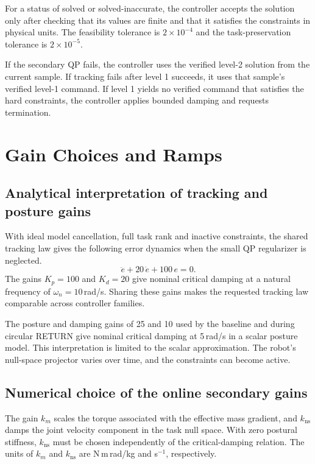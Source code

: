 \documentclass[12pt,a4paper]{article}
\begin{document}
For a status of solved or solved-inaccurate, the controller accepts the solution only
after checking that its values are finite and that it satisfies the constraints in
physical units. The feasibility tolerance is $2 \times 10^{-4}$ and the
task-preservation tolerance is $2 \times 10^{-5}$.

If the secondary QP fails, the controller uses the verified level-2 solution
from the current sample. If tracking fails after level 1 succeeds, it uses that
sample's verified level-1 command. If level 1 yields no verified command that
satisfies the hard constraints, the controller applies bounded damping and requests
termination.

\section{Gain Choices and Ramps}

\subsection{Analytical interpretation of tracking and posture gains}
With ideal model cancellation, full task rank and inactive constraints, the
shared tracking law gives the following error dynamics when the small QP
regularizer is neglected.
\begin{equation}
  \ddot e + 20\, \dot e + 100\, e = 0 .
\end{equation}
The gains $K_p = 100$ and $K_d = 20$ give nominal critical damping at a natural
frequency of $\omega_n = 10$\,rad/s. Sharing these gains makes the requested
tracking law comparable across controller families.

The posture and damping gains of 25 and 10 used by the baseline and during circular
RETURN give nominal critical damping at 5\,rad/s in a scalar posture model. This
interpretation is limited to the scalar approximation. The robot's null-space
projector varies over time, and the constraints can become active.

\subsection{Numerical choice of the online secondary gains}
The gain $k_m$ scales the torque associated with the effective mass gradient,
and $k_{\mathrm{ns}}$ damps the joint velocity component in the task null space.
With zero postural stiffness, $k_{\mathrm{ns}}$ must be chosen independently of the critical-damping
relation. The units of $k_m$ and $k_{\mathrm{ns}}$ are N\,m\,rad/kg and s$^{-1}$,
respectively.
\end{document}
